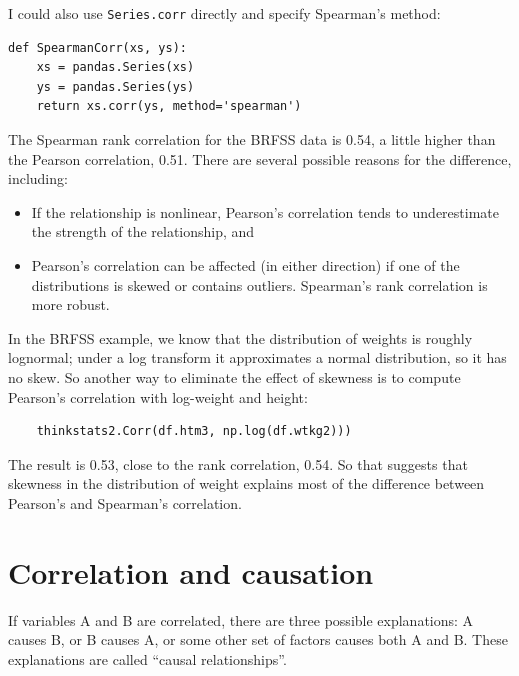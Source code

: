 I could also use {\tt Series.corr} directly and specify
Spearman's method:

\begin{verbatim}
def SpearmanCorr(xs, ys):
    xs = pandas.Series(xs)
    ys = pandas.Series(ys)
    return xs.corr(ys, method='spearman')
\end{verbatim}

The Spearman rank correlation for the BRFSS data is 0.54, a little
higher than the Pearson correlation, 0.51.  There are several possible
reasons for the difference, including:

\begin{itemize}

\item If the relationship is
nonlinear, Pearson's correlation tends to underestimate the strength
of the relationship, and 

\item Pearson's correlation can be affected (in either direction)
if one of the distributions is skewed or contains outliers.  Spearman's
rank correlation is more robust.

\end{itemize}

In the BRFSS example, we know that the distribution of weights is
roughly lognormal; under a log transform it approximates a normal
distribution, so it has no skew.
So another way to eliminate the effect of skewness is to
compute Pearson's
correlation with log-weight and height:

\begin{verbatim}
    thinkstats2.Corr(df.htm3, np.log(df.wtkg2)))
\end{verbatim}

The result is 0.53, close to the rank correlation, 0.54.  So that
suggests that skewness in the distribution of weight explains most of
the difference between Pearson's and Spearman's correlation.


\section{Correlation and causation}

If variables A and B are correlated, there are three possible
explanations: A causes B, or B causes A, or some other set of factors
causes both A and B.  These explanations are called ``causal
relationships''.

